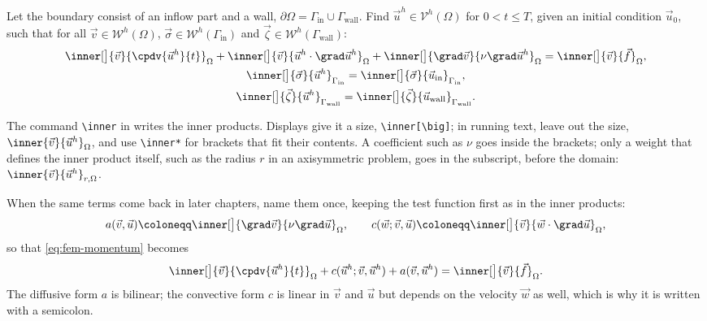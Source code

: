 \begin{formulation}\label{form:burgers}
Let the boundary consist of an inflow part and a wall, $\partial\Omega = \Gamma_\mathrm{in} \cup \Gamma_\mathrm{wall}$. Find $\vec{u}^h \in \mathcal{V}^h(\Omega)$ for $0 < t \leq T$, given an initial condition $\vec{u}_0$, such that for all $\vec{v} \in \mathcal{W}^h(\Omega)$, $\vec{\sigma} \in \mathcal{W}^h(\Gamma_\mathrm{in})$ and $\vec{\zeta} \in \mathcal{W}^h(\Gamma_\mathrm{wall})$:
\begin{subequations}\label{eq:fem}
\begin{gather}
    \inner[\big]{\vec{v}}{\cpdv{\vec{u}^h}{t}}_\Omega
    + \inner[\big]{\vec{v}}{\vec{u}^h \cdot \grad\vec{u}^h}_\Omega
    + \inner[\big]{\grad\vec{v}}{\nu \grad\vec{u}^h}_\Omega
    = \inner[\big]{\vec{v}}{\vec{f}}_\Omega ,                                 \label{eq:fem-momentum} \\
    \inner[\big]{\vec{\sigma}}{\vec{u}^h}_{\Gamma_\mathrm{in}}
    = \inner[\big]{\vec{\sigma}}{\vec{u}_\mathrm{in}}_{\Gamma_\mathrm{in}} ,       \label{eq:fem-inflow} \\
    \inner[\big]{\vec{\zeta}}{\vec{u}^h}_{\Gamma_\mathrm{wall}}
    = \inner[\big]{\vec{\zeta}}{\vec{u}_\mathrm{wall}}_{\Gamma_\mathrm{wall}} .    \label{eq:fem-wall}
\end{gather}
\end{subequations}
\end{formulation}

The command \verb|\inner| in  writes the inner products. Displays give it a size, \verb|\inner[\big]|; in running text, leave out the size, $\inner{\vec{v}}{\vec{u}^h}_\Omega$, and use \verb|\inner*| for brackets that fit their contents. A coefficient such as $\nu$ goes inside the brackets; only a weight that defines the inner product itself, such as the radius $r$ in an axisymmetric problem, goes in the subscript, before the domain: $\inner{\vec{v}}{\vec{u}^h}_{r,\Omega}$.

When the same terms come back in later chapters, name them once, keeping the test function first as in the inner products:
\begin{equation*}
    a(\vec{v}, \vec{u}) \coloneqq \inner[\big]{\grad\vec{v}}{\nu \grad\vec{u}}_\Omega ,
    \qquad
    c(\vec{w}; \vec{v}, \vec{u}) \coloneqq \inner[\big]{\vec{v}}{\vec{w} \cdot \grad\vec{u}}_\Omega ,
\end{equation*}
so that \cref{eq:fem-momentum} becomes
\begin{equation*}
    \inner[\big]{\vec{v}}{\cpdv{\vec{u}^h}{t}}_\Omega + c(\vec{u}^h; \vec{v}, \vec{u}^h) + a(\vec{v}, \vec{u}^h) = \inner[\big]{\vec{v}}{\vec{f}}_\Omega .
\end{equation*}
The diffusive form $a$ is bilinear; the convective form $c$ is linear in $\vec{v}$ and $\vec{u}$ but depends on the velocity $\vec{w}$ as well, which is why it is written with a semicolon.

